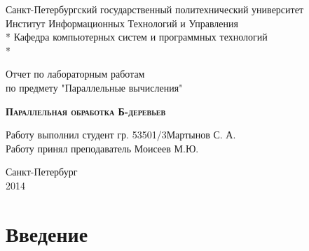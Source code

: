 \documentclass[a4paper, 12pt]{report}		%
\begin{document}
\begin{titlepage}
\thispagestyle{empty}

\begin{center}
Санкт-Петербургский государственный политехнический университет \\
Институт Информационных Технологий и Управления \\*
Кафедра компьютерных систем и программных технологий \\*
\hrulefill
\end{center}

\vspace{18em}

\begin{center}
\Large Отчет по лабораторным работам \\ по предмету "Параллельные вычисления" \\
\end{center}

\vspace{1em}

\begin{center}
\textsc{\textbf{Параллельная обработка Б-деревьев}}
\end{center}

\vspace{16em}

\begin{flushleft}
Работу выполнил студент гр. 53501/3\hrulefill Мартынов С. А. \\
\vspace{1.5em}
Работу принял преподаватель \hrulefill Моисеев М.Ю. \\
\end{flushleft}

\vspace{\fill}

\begin{center}
Санкт-Петербург \\
2014
\end{center}

\end{titlepage}
\setcounter{page}{2}
\tableofcontents

\chapter*{Введение}
\end{document}
